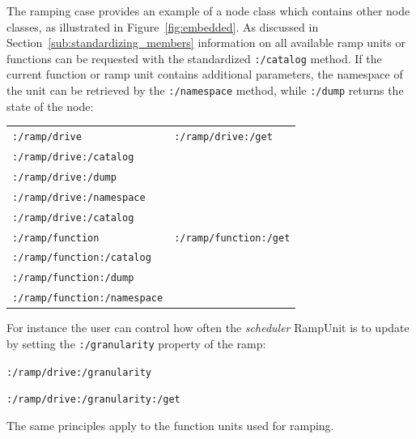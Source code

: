 \documentclass{NIME-alternate}
\begin{document}
The ramping case provides an example of a node class which contains other node classes, as illustrated in Figure~\ref{fig:embedded}. As discussed in Section~\ref{sub:standardizing_members} information on all available ramp units or functions can be requested with the standardized \texttt{:/catalog} method. If the current function or ramp unit contains additional parameters, the namespace of the unit can be retrieved by the \texttt{:/namespace} method, while \texttt{:/dump} returns the state of the node:

\begin{tabular}{ll}
	\texttt{:/ramp/drive} & \texttt{:/ramp/drive:/get} \\
	\texttt{:/ramp/drive:/catalog} \\
	\texttt{:/ramp/drive:/dump} \\
	\texttt{:/ramp/drive:/namespace} \\
	\texttt{:/ramp/drive:/catalog} \\
	\texttt{:/ramp/function}  & \texttt{:/ramp/function:/get} \\
	\texttt{:/ramp/function:/catalog} \\
	\texttt{:/ramp/function:/dump} \\
	\texttt{:/ramp/function:/namespace} \\
\end{tabular}

For instance the user can control how often the \emph{scheduler} RampUnit is to update by setting the \texttt{:/granularity} property of the ramp:

\texttt{:/ramp/drive:/granularity}

\texttt{:/ramp/drive:/granularity:/get}

The same principles apply to the function units used for ramping. 














\end{document}
